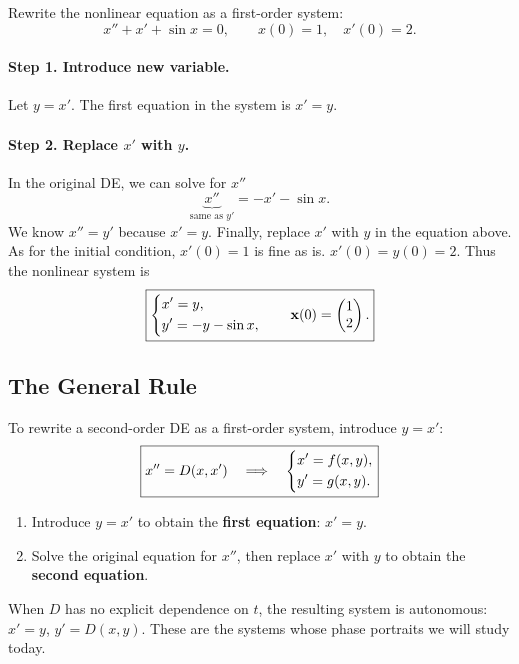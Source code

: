 \documentclass[10pt,letterpaper]{article}
\begin{document}
\begin{example}[1]{
Rewrite the nonlinear equation as a first-order system:
\[
x''+x'+\sin x=0,
\qquad x(0)=1,\quad x'(0)=2.
\]
}
\paragraph{Step 1. Introduce new variable.}
Let $y=x'$. The first equation in the system is $x'=y$.

\paragraph{Step 2. Replace $x'$ with $y$.}
In the original DE, we can solve for $x''$ 
$$
   \underbrace{ x''}_{\text{same as }y'} = -x'-\sin x.
$$
We know $x''=y'$ because $x'=y$. Finally, replace $x'$ with $y$ in the equation above. As for the initial condition, $x'(0)=1$ is fine as is. $x'(0)=y(0)=2$. Thus the nonlinear system is
\[
\boxed{
\begin{dcases}
x'=y,\\
y'=-y-\sin x,
\end{dcases}
\qquad
\mathbf{x}(0)=\begin{pmatrix}1\\2\end{pmatrix}.
}
\]
\end{example}

\subsection{The General Rule}
To rewrite a second-order DE as a first-order system, introduce $y=x'$:
\[
\boxed{
x''=D(x,x')
\quad\Longrightarrow\quad
\begin{dcases}
x'=f(x,y),\\
y'=g(x,y).
\end{dcases}
}
\]
\begin{enumerate}
    \item Introduce $y=x'$ to obtain the \textbf{first equation}: $x'=y$.
    \item Solve the original equation for $x''$, then replace $x'$ with $y$ to obtain the \textbf{second equation}.
\end{enumerate}
When $D$ has no explicit dependence on $t$, the resulting system is autonomous:
$x'=y$, $y'=D(x,y)$. These are the systems whose phase portraits we will study today.

\end{document}
